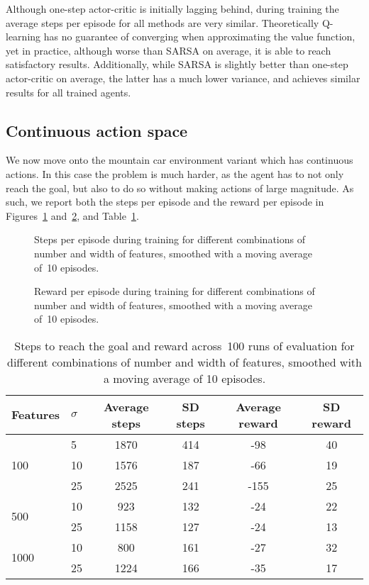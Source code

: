 Although one-step actor-critic is initially lagging behind, during training the average steps per episode for all methods are very similar. Theoretically Q-learning has no guarantee of converging when approximating the value function, yet in practice, although worse than SARSA on average, it is able to reach satisfactory results. Additionally, while SARSA is slightly better than one-step actor-critic on average, the latter has a much lower variance, and achieves similar results for all trained agents.

\subsection{Continuous action space}
We now move onto the mountain car environment variant which has continuous actions. In this case the problem is much harder, as the agent has to not only reach the goal, but also to do so without making actions of large magnitude. As such, we report both the steps per episode and the reward per episode in Figures~\ref{fig:features_continuous_action_steps} and~\ref{fig:features_continuous_action_rewards}, and Table~\ref{tab:features_continuous_action}. 
\begin{figure}
\centering

\caption{Steps per episode during training for different combinations of number and width of features, smoothed with a moving average of~10 episodes.}
\label{fig:features_continuous_action_steps}
\end{figure}
\begin{figure}[ht]
\centering

\caption{Reward per episode during training for different combinations of number and width of features, smoothed with a moving average of~10 episodes.}
\label{fig:features_continuous_action_rewards}
\end{figure}
\begin{table}
\centering
\begin{tabular}{l l c c c c}
\toprule
Features & ${\sigma}$ & Average steps & SD steps & Average reward & SD reward \\
\midrule
\multirow{3}{*}{100} & 5 & 1870 & 414 & -98 & 40 \\
& 10 & 1576 & 187 & -66 & 19 \\
& 25 & 2525 & 241 & -155 & 25 \\
\midrule
\multirow{2}{*}{500} & 10 & 923 & 132 & -24 & 22 \\
& 25 & 1158 & 127 & -24 & 13 \\
\midrule
\multirow{2}{*}{1000} & 10 & 800 & 161 & -27 & 32 \\
& 25 & 1224 & 166 & -35 & 17 \\
\bottomrule
\end{tabular}
\caption{Steps to reach the goal and reward across~100 runs of evaluation for different combinations of number and width of features, smoothed with a moving average of 10 episodes.}
\label{tab:features_continuous_action}
\end{table}

